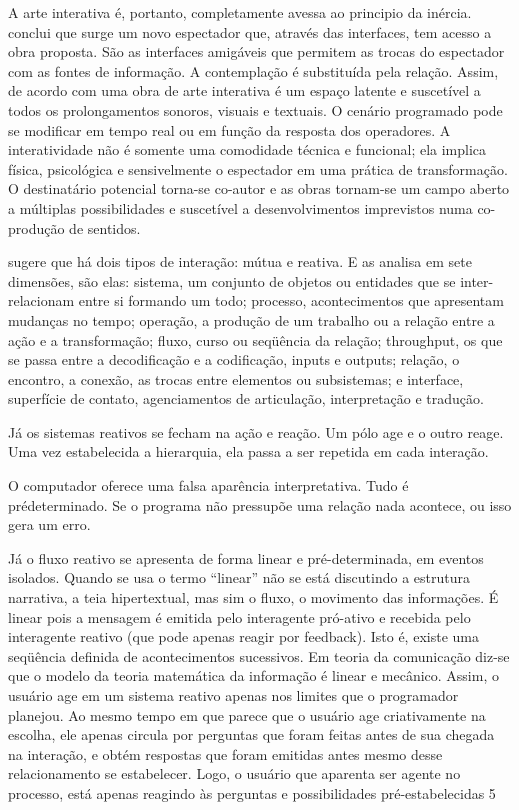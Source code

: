A arte interativa é, portanto, completamente avessa ao principio da inércia.  conclui que surge um novo espectador que, através das interfaces, tem acesso a obra proposta. São as interfaces amigáveis que permitem as trocas do espectador com as fontes de informação. A contemplação é substituída pela relação. Assim, de acordo com  uma obra de arte interativa é um espaço latente e suscetível a todos os prolongamentos sonoros, visuais e textuais. O cenário programado pode se modificar em tempo real ou em função da resposta dos operadores. A interatividade não é somente uma comodidade técnica e funcional; ela implica física, psicológica e sensivelmente o espectador em uma prática de transformação. O destinatário potencial torna-se co-autor e as obras tornam-se um campo aberto a múltiplas possibilidades e suscetível a desenvolvimentos imprevistos numa co-produção de sentidos.	

 sugere que há dois tipos de interação: mútua e reativa. E as analisa em sete dimensões, são elas: sistema, um conjunto de objetos ou entidades que se inter-relacionam entre si formando um todo; processo, acontecimentos que apresentam mudanças no tempo; operação, a produção de um trabalho ou a relação entre a ação e a
transformação; fluxo, curso ou seqüência da relação; throughput, os que se passa entre a decodificação e a codificação, inputs e outputs; relação, o encontro, a conexão, as trocas entre elementos ou subsistemas; e interface, superfície de contato, agenciamentos de articulação, interpretação e tradução.

Já os sistemas reativos se fecham na ação e reação. Um pólo age e o outro reage. Uma vez estabelecida a hierarquia, ela passa a ser repetida em cada interação. 

O computador oferece uma falsa aparência interpretativa. Tudo é prédeterminado.
Se o programa não pressupõe uma relação nada acontece, ou isso gera um erro.

Já o fluxo reativo se apresenta de forma linear e pré-determinada,
em eventos isolados. Quando se usa o termo “linear” não se está discutindo a
estrutura narrativa, a teia hipertextual, mas sim o fluxo, o movimento das
informações. É linear pois a mensagem é emitida pelo interagente pró-ativo e recebida
pelo interagente reativo (que pode apenas reagir por feedback). Isto é, existe uma
seqüência definida de acontecimentos sucessivos. Em teoria da comunicação diz-se
que o modelo da teoria matemática da informação é linear e mecânico. Assim, o
usuário age em um sistema reativo apenas nos limites que o programador planejou.
Ao mesmo tempo em que parece que o usuário age criativamente na escolha, ele
apenas circula por perguntas que foram feitas antes de sua chegada na interação, e
obtém respostas que foram emitidas antes mesmo desse relacionamento se
estabelecer. Logo, o usuário que aparenta ser agente no processo, está apenas
reagindo às perguntas e possibilidades pré-estabelecidas
5


